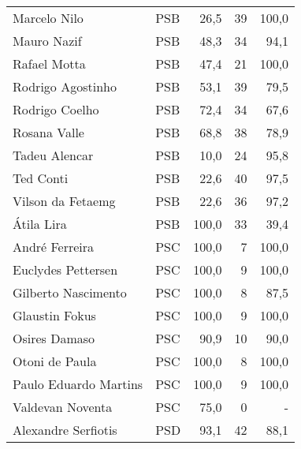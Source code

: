 \begin{longtable}{llrrr}
                        Marcelo Nilo &            PSB &      26,5 &           39 &      100,0 \\
                         Mauro Nazif &            PSB &      48,3 &           34 &       94,1 \\
                        Rafael Motta &            PSB &      47,4 &           21 &      100,0 \\
                   Rodrigo Agostinho &            PSB &      53,1 &           39 &       79,5 \\
                      Rodrigo Coelho &            PSB &      72,4 &           34 &       67,6 \\
                        Rosana Valle &            PSB &      68,8 &           38 &       78,9 \\
                       Tadeu Alencar &            PSB &      10,0 &           24 &       95,8 \\
                           Ted Conti &            PSB &      22,6 &           40 &       97,5 \\
                   Vilson da Fetaemg &            PSB &      22,6 &           36 &       97,2 \\
                          Átila Lira &            PSB &     100,0 &           33 &       39,4 \\
                      André Ferreira &            PSC &     100,0 &            7 &      100,0 \\
                  Euclydes Pettersen &            PSC &     100,0 &            9 &      100,0 \\
                 Gilberto Nascimento &            PSC &     100,0 &            8 &       87,5 \\
                      Glaustin Fokus &            PSC &     100,0 &            9 &      100,0 \\
                       Osires Damaso &            PSC &      90,9 &           10 &       90,0 \\
                      Otoni de Paula &            PSC &     100,0 &            8 &      100,0 \\
               Paulo Eduardo Martins &            PSC &     100,0 &            9 &      100,0 \\
                    Valdevan Noventa &            PSC &      75,0 &            0 &          - \\
                 Alexandre Serfiotis &            PSD &      93,1 &           42 &       88,1 \\

\end{longtable}
